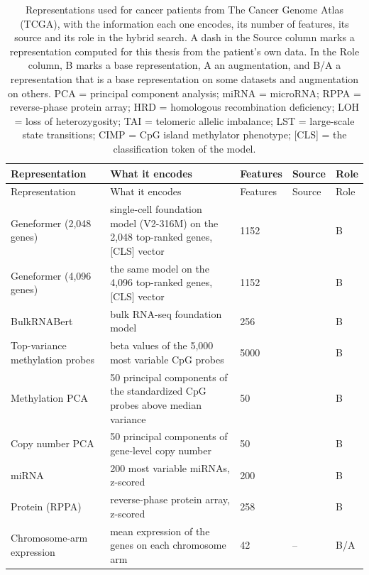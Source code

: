 \begin{longtable}{P{3.0cm}P{5.0cm}P{1.5cm}P{1.5cm}P{1.4cm}}
\caption[Representations used for cancer patients.]{Representations used for cancer patients from The Cancer Genome Atlas (TCGA), with the information each one encodes, its number of features, its source and its role in the hybrid search. A dash in the Source column marks a representation computed for this thesis from the patient's own data. In the Role column, B marks a base representation, A an augmentation, and B/A a representation that is a base representation on some datasets and augmentation on others. PCA = principal component analysis; miRNA = microRNA; RPPA = reverse-phase protein array; HRD = homologous recombination deficiency; LOH = loss of heterozygosity; TAI = telomeric allelic imbalance; LST = large-scale state transitions; CIMP = CpG island methylator phenotype; [CLS] = the classification token of the model.}\label{tab:reps_tcga}\\
\toprule
Representation & What it encodes & Features & Source & Role \\
\midrule
\endfirsthead
\toprule
Representation & What it encodes & Features & Source & Role \\
\midrule
\endhead
\bottomrule
\endfoot
Geneformer (2,048 genes) & single-cell foundation model (V2-316M) on the 2,048 top-ranked genes, [CLS] vector & 1152 & \citep{Theodoris2023, Geneformer2024card} & B \\
Geneformer (4,096 genes) & the same model on the 4,096 top-ranked genes, [CLS] vector & 1152 & \citep{Theodoris2023, Geneformer2024card} & B \\
BulkRNABert & bulk RNA-seq foundation model & 256 & \citep{Gelard2024} & B \\
Top-variance methylation probes & beta values of the 5,000 most variable CpG probes & 5000 & \citep{Goldman2020} & B \\
Methylation PCA & 50 principal components of the standardized CpG probes above median variance & 50 & \citep{Goldman2020} & B \\
Copy number PCA & 50 principal components of gene-level copy number & 50 & \citep{Mermel2011} & B \\
miRNA & 200 most variable miRNAs, z-scored & 200 & \citep{Goldman2020} & B \\
Protein (RPPA) & reverse-phase protein array, z-scored & 258 & \citep{Li2013TCPA} & B \\
Chromosome-arm expression & mean expression of the genes on each chromosome arm & 42 & -- & B/A \\

\end{longtable}
